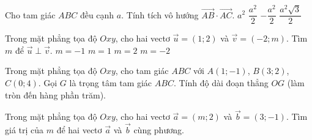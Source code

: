 \begin{ex}%
Cho tam giác $ABC$ đều cạnh $a$. Tính tích vô hướng $\overrightarrow{AB}\cdot\overrightarrow{AC}$.
\choice
{$a^2$}
{\True $\dfrac{a^2}{2}$}
{$-\dfrac{a^2}{2}$}
{$\dfrac{a^2\sqrt{3}}{2}$}
\end{ex}

\begin{ex}%
Trong mặt phẳng tọa độ $Oxy$, cho hai vectơ $\overrightarrow{u}=(1;2)$ và $\overrightarrow{v}=(-2;m)$. Tìm $m$ để $\overrightarrow{u}\perp\overrightarrow{v}$.
\choice
{$m=-1$}
{\True $m=1$}
{$m=2$}
{$m=-2$}
\end{ex}

\begin{bt}%
Trong mặt phẳng tọa độ $Oxy$, cho tam giác $ABC$ với $A(1;-1)$, $B(3;2)$, $C(0;4)$. Gọi $G$ là trọng tâm tam giác $ABC$. Tính độ dài đoạn thẳng $OG$ (làm tròn đến hàng phần trăm).
\end{bt}

\begin{bt}%
Trong mặt phẳng tọa độ $Oxy$, cho hai vectơ $\overrightarrow{a}=(m;2)$ và $\overrightarrow{b}=(3;-1)$. Tìm giá trị của $m$ để hai vectơ $\overrightarrow{a}$ và $\overrightarrow{b}$ cùng phương.
\end{bt}

